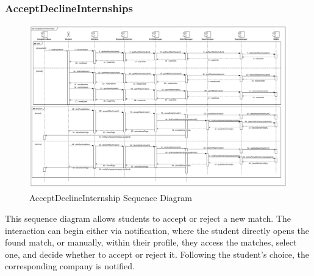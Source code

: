 \documentclass{article}
\begin{document}
\subsubsection{AcceptDeclineInternships}
\begin{figure}[H]
    \centering
    \includegraphics[width=1\linewidth]{SequenceDiagram/AccDeclInterSD.png}
    \caption{AcceptDeclineInternship Sequence Diagram}
    \label{fig:enter-label}
\end{figure}
This sequence diagram allows students to accept or reject a new match. The interaction can begin either via notification, where the student directly opens the found match, or manually, within their profile, they access the matches, select one, and decide whether to accept or reject it. Following the student's choice, the corresponding company is notified.
\end{document}
